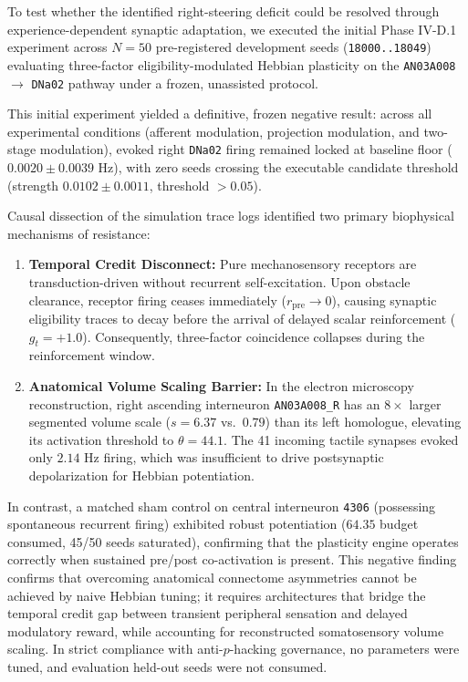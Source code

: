 \documentclass[10pt,letterpaper]{article}
\begin{document}
To test whether the identified right-steering deficit could be resolved through experience-dependent synaptic adaptation, we executed the initial Phase IV-D.1 experiment across $N = 50$ pre-registered development seeds (\texttt{18000..18049}) evaluating three-factor eligibility-modulated Hebbian plasticity on the \texttt{AN03A008} $\to$ \texttt{DNa02} pathway under a frozen, unassisted protocol.

This initial experiment yielded a definitive, frozen negative result: across all experimental conditions (afferent modulation, projection modulation, and two-stage modulation), evoked right \texttt{DNa02} firing remained locked at baseline floor ($0.0020 \pm 0.0039\text{ Hz}$), with zero seeds crossing the executable candidate threshold (strength $0.0102 \pm 0.0011$, threshold $>0.05$).

Causal dissection of the simulation trace logs identified two primary biophysical mechanisms of resistance:
\begin{enumerate}
    \item \textbf{Temporal Credit Disconnect:} Pure mechanosensory receptors are transduction-driven without recurrent self-excitation. Upon obstacle clearance, receptor firing ceases immediately ($r_{\text{pre}} \to 0$), causing synaptic eligibility traces to decay before the arrival of delayed scalar reinforcement ($g_t = +1.0$). Consequently, three-factor coincidence collapses during the reinforcement window.
    \item \textbf{Anatomical Volume Scaling Barrier:} In the electron microscopy reconstruction, right ascending interneuron \texttt{AN03A008\_R} has an $8\times$ larger segmented volume scale ($s = 6.37$ vs.\ $0.79$) than its left homologue, elevating its activation threshold to $\theta = 44.1$. The 41 incoming tactile synapses evoked only $2.14\text{ Hz}$ firing, which was insufficient to drive postsynaptic depolarization for Hebbian potentiation.
\end{enumerate}

In contrast, a matched sham control on central interneuron \texttt{4306} (possessing spontaneous recurrent firing) exhibited robust potentiation ($64.35$ budget consumed, 45/50 seeds saturated), confirming that the plasticity engine operates correctly when sustained pre/post co-activation is present. This negative finding confirms that overcoming anatomical connectome asymmetries cannot be achieved by naive Hebbian tuning; it requires architectures that bridge the temporal credit gap between transient peripheral sensation and delayed modulatory reward, while accounting for reconstructed somatosensory volume scaling. In strict compliance with anti-$p$-hacking governance, no parameters were tuned, and evaluation held-out seeds were not consumed.
\end{document}

